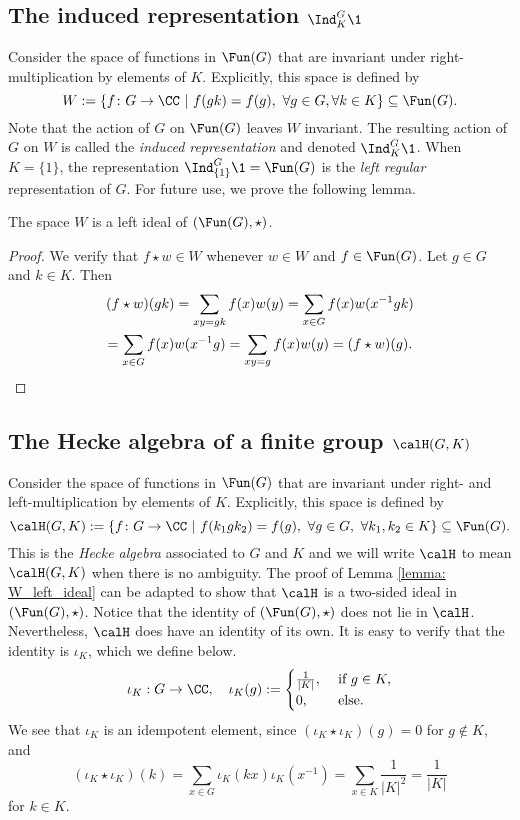 \subsection{The induced representation $\Ind_K^G \1$}\label{Section1.2}
Consider the space of functions in $\Fun(G)$ that are invariant under right-multiplication by elements of $K$.
Explicitly, this space is defined by
\[
    W: = \{f\colon G\to \CC\ |\ f(gk) = f(g),\ \forall g\in G, \forall k \in K\} \subseteq \Fun(G).
\]
Note that the action of $G$ on $\Fun(G)$ leaves $W$ invariant.
The resulting action of $G$ on $W$ is called the \emph{induced representation} and denoted $\Ind_K^G \1$.
When $K=\{1\}$, the representation $\Ind_{\{1\}}^G\1=\Fun(G)$ is the \emph{left regular} representation of $G$.
For future use, we prove the following lemma.
\begin{lem}\label{lemma: W_left_ideal}
    The space $W$ is a left ideal of $(\Fun(G),\star)$.
\end{lem}
\begin{proof}
    We verify that $f\star w\in W$ whenever $w\in W$ and $f\in\Fun(G)$.
    Let $g\in G$ and $k\in K$.
    Then
    \begin{multline*}
        (f\star w)(gk) = \sum_{xy=gk} f(x)w(y) = \sum_{x\in G} f(x)w(x^{-1}gk) \\
        = \sum_{x\in G} f(x)w(x^{-1}g) = \sum_{xy=g} f(x)w(y) = (f\star w)(g).\qedhere
    \end{multline*}
\end{proof}


\subsection{The Hecke algebra of a finite group $\calH(G,K)$}\label{Section1.3}
Consider the space of functions in $\Fun(G)$ that are invariant under right- and left-multiplication by elements of $K$.
Explicitly, this space is defined by
\[
    \calH(G,K) := \{f\colon G\to \CC\ |\ f(k_1gk_2) = f(g),\ \forall g\in G,\ \forall k_1,k_2\in K\} \subseteq \Fun(G).
\]
This is the \emph{Hecke algebra} associated to $G$ and $K$ and we will write $\calH$ to mean $\calH(G,K)$ when there is no ambiguity.
The proof of Lemma \ref{lemma: W_left_ideal} can be adapted to show that $\calH$ is a two-sided ideal in $(\Fun(G),\star)$.
Notice that the identity of $(\Fun(G),\star)$ does not lie in $\calH$.
Nevertheless, $\calH$ does have an identity of its own.
It is easy to verify that the identity is $\iota_K$, which we define below.
\[
    \iota_K:G\to\CC,\quad \iota_K(g) := \begin{cases}
        \frac{1}{|K|},\  & \text{if}\ g\in K, \\
        0,\              & \text{else}.
    \end{cases}
\]
We see that $\iota_K$ is an idempotent element, since $(\iota_K\star\iota_K)(g)=0$ for $g\notin K$, and
\[
    (\iota_K\star\iota_K)(k) = \sum_{x\in G} \iota_K(kx)\iota_K(x^{-1}) = \sum_{x\in K} \frac{1}{|K|^2} = \frac{1}{|K|}
\]
for $k\in K$.

